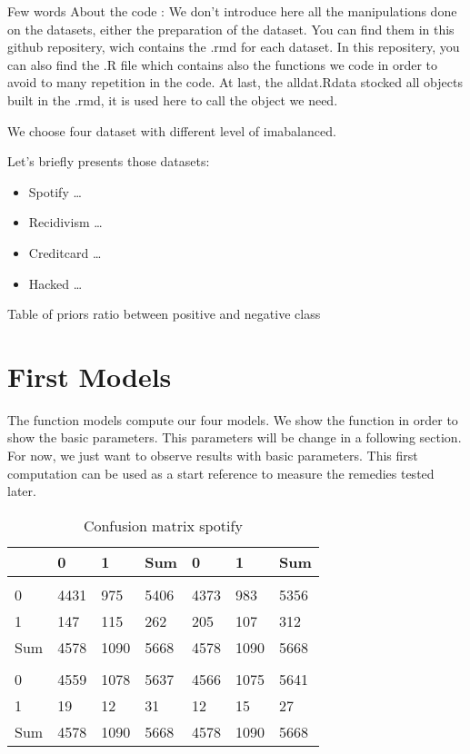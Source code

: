 \documentclass[
]{report}
\providecommand{\tightlist}{%
  \setlength{\itemsep}{0pt}\setlength{\parskip}{0pt}}
\begin{document}
Few words About the code : We don't introduce here all the manipulations done on the datasets, either the preparation of the dataset. You can find them in this github repositery, wich contains the .rmd for each dataset. In this repositery, you can also find the .R file which contains also the functions we code in order to avoid to many repetition in the code. At last, the alldat.Rdata stocked all objects built in the .rmd, it is used here to call the object we need.

We choose four dataset with different level of imabalanced.

Let's briefly presents those datasets:

\begin{itemize}
\tightlist
\item
  Spotify \ldots{}
\item
  Recidivism \ldots{}
\item
  Creditcard \ldots{}
\item
  Hacked \ldots{}
\end{itemize}

Table of priors ratio between positive and negative class

\hypertarget{first-models}{%
\section{First Models}\label{first-models}}

The function models compute our four models. We show the function in order to show the basic parameters. This parameters will be change in a following section. For now, we just want to observe results with basic parameters. This first computation can be used as a start reference to measure the remedies tested later.

\begin{table}

\caption{\label{tab:unnamed-chunk-4}Confusion matrix spotify}
\centering
\begin{tabular}[t]{l|l|l|l|l|l|l}
\hline
  & 0 & 1 & Sum & 0 & 1 & Sum\\
\hline
\cellcolor{lightgrey}{} & \cellcolor{lightgrey}{rf} & \cellcolor{lightgrey}{} & \cellcolor{lightgrey}{} & \cellcolor{lightgrey}{bayes} & \cellcolor{lightgrey}{} & \cellcolor{lightgrey}{}\\
\hline
0 & 4431 & 975 & 5406 & 4373 & 983 & 5356\\
\hline
1 & 147 & 115 & 262 & 205 & 107 & 312\\
\hline
Sum & 4578 & 1090 & 5668 & 4578 & 1090 & \vphantom{1} 5668\\
\hline
\cellcolor{lightgrey}{} & \cellcolor{lightgrey}{lda} & \cellcolor{lightgrey}{} & \cellcolor{lightgrey}{} & \cellcolor{lightgrey}{svm} & \cellcolor{lightgrey}{} & \cellcolor{lightgrey}{}\\
\hline
0 & 4559 & 1078 & 5637 & 4566 & 1075 & 5641\\
\hline
1 & 19 & 12 & 31 & 12 & 15 & 27\\
\hline
Sum & 4578 & 1090 & 5668 & 4578 & 1090 & 5668\\
\hline
\end{tabular}
\end{table}
\end{document}
